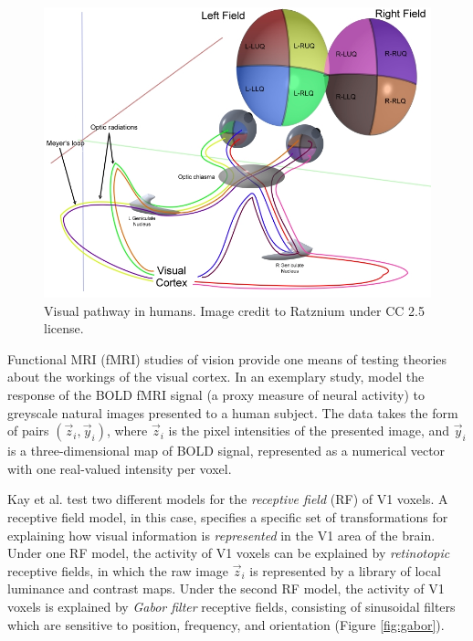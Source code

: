 \begin{figure}
\centering
\includegraphics[scale = 1]{Figures/ERP_-_optic_cabling.jpg}
\caption{Visual pathway in humans.  Image credit to Ratznium under CC 2.5 license.}
\label{fig:visual_pathway}
\end{figure}

Functional MRI (fMRI) studies of vision provide one means of testing
theories about the workings of the visual cortex.  In an exemplary
study, \cite{Kay2008a} model the response of the BOLD fMRI signal (a
proxy measure of neural activity) to greyscale natural images
presented to a human subject.  The data takes the form of pairs
$(\vec{z}_i, \vec{y}_i)$, where $\vec{z}_i$ is the pixel intensities
of the presented image, and $\vec{y}_i$ is a three-dimensional map of
BOLD signal, represented as a numerical vector with one real-valued
intensity per voxel.

Kay et al. test two different models for the \emph{receptive field}
(RF) of V1 voxels.  A receptive field model, in this case, specifies a
specific set of transformations for explaining how visual information
is \emph{represented} in the V1 area of the brain.  Under one RF
model, the activity of V1 voxels can be explained by
\emph{retinotopic} receptive fields, in which the raw image
$\vec{z}_i$ is represented by a library of local luminance and
contrast maps.  Under the second RF model, the activity of V1 voxels
is explained by \emph{Gabor filter} receptive fields, consisting of
sinusoidal filters which are sensitive to position, frequency, and
orientation (Figure \ref{fig:gabor}).


